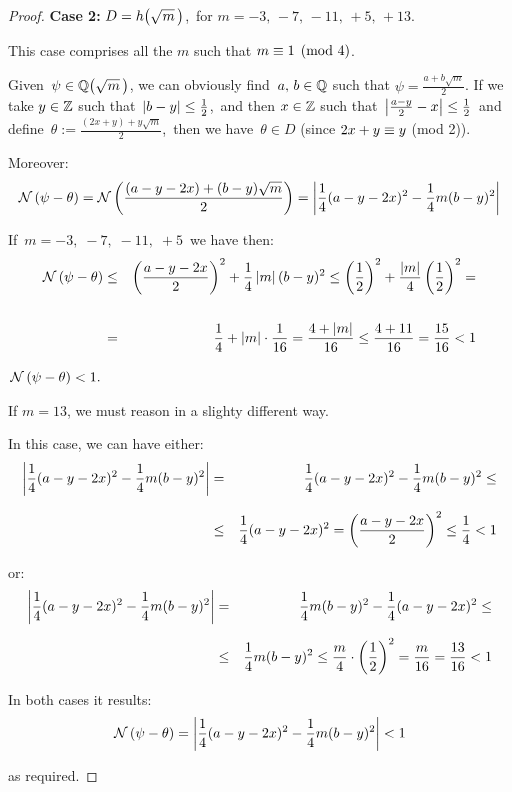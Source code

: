 \begin{proof}
\smallskip

\textbf{Case 2:} $ D = \hh{m}$,\,
                   for $m = -3,\, -7,\, -11,\, +5,\, +13$.

This case comprises all the $m$ such that $m \equiv 1 \pmod 4$.

Given\, $\psi \in \QQ{m}$, we can obviously find\, $a,\,b\in\mathbb{Q}$
such that $\psi = \frac{a + b\sqrt{m}}{2}$.
If we take $y \in \mathbb{Z}$ such that\,
$\left|b - y\right| \leq \frac{1}{2}$,\, and then $x \in \mathbb{Z}$
such that\, $\left|\frac{a - y}{2} - x\right| \leq \frac{1}{2}$\,
and define\, \mbox{$\theta:= \frac{(2x+y) + y\sqrt{m}}{2}$,}
\,then we have\, $\theta \in D$
(since $ 2x + y \equiv y $ (mod 2)).

Moreover:
$$
\mathcal{N}\left(\psi - \theta\right) =
\mathcal{N}\left(\frac{(a -y - 2x) + (b - y)\sqrt{m}}{2}\right) =
\left|\frac{1}{4}(a -y - 2x)^2 - \frac{1}{4} m (b - y)^2\right|
$$

\smallskip
If\, $m = -3,\; -7,\; -11,\; +5$\, we have then:
\smallskip
%
\begin{eqnarray*}
\mathcal{N}\left(\psi - \theta\right) & \leq &
\left( \frac{a -y - 2x} {2} \right)^2 +
  \frac{1}{4} \left|m\right| (b - y)^2
\leq \left(\frac{1}{2}\right)^2
+ \frac{\left|m\right|}{4}\left(\frac{1}{2}\right)^2 = \\
& & \\
& = & \frac{1}{4} + \left|m\right|\cdot\frac{1}{16} =
\frac{4+\left|m\right|}{16}
\leq \frac{4 + 11}{16} = \frac{15}{16} < 1
\end{eqnarray*}

\smallskip
\ie \,$\mathcal{N}\left(\psi - \theta\right) < 1.$
%

\smallskip
If $m = 13$, we must reason in a slighty different way.

In this case, we can have either:
%
\begin{eqnarray*}
\left| \frac{1}{4}(a -y - 2x)^2 - \frac{1}{4} m (b - y)^2 \right|
& = & \frac{1}{4}(a - y - 2x)^2 - \frac{1}{4} m (b - y)^2 \leq \\[7pt]
& \leq & \frac{1}{4}(a - y - 2x)^2 = \left(\frac{a -y - 2x}{2}\right)^2
\leq \frac{1}{4} < 1
\end{eqnarray*}

or: \smallskip
%
\begin{eqnarray*}
\left| \frac{1}{4}(a -y - 2x)^2 - \frac{1}{4} m (b - y)^2 \right|
& = & \frac{1}{4} m (b - y)^2 - \frac{1}{4}(a -y - 2x)^2 \leq \\[6pt]
& \leq & \frac{1}{4} m (b - y)^2 \leq
\frac{m}{4} \cdot \left(\frac{1}{2}\right)^2 =
\frac{m}{16} = \frac{13}{16} < 1
\end{eqnarray*}

In both cases it results:
$$
\mathcal{N}\left(\psi - \theta\right) =
\left| \frac{1}{4}(a - y - 2x)^2 - \frac{1}{4} m(b - y)^2 \right|
< 1
$$

as required.
%
\end{proof}


